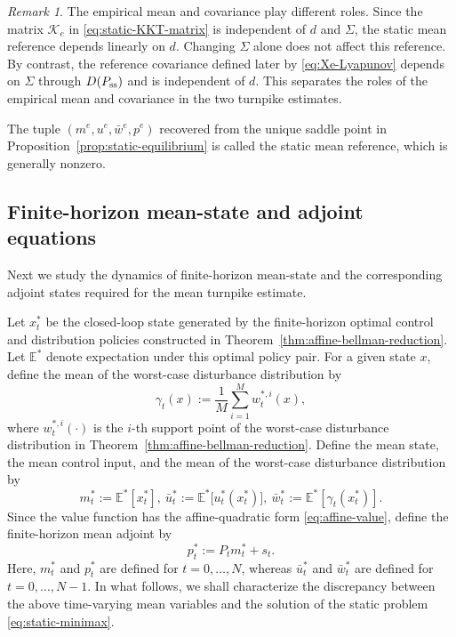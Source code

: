 \documentclass[10pt,journal,twoside]{IEEEtran}
\theoremstyle{definition}
\theoremstyle{remark}
\newtheorem{remark}{Remark}
\begin{document}
\begin{remark}
The empirical mean and covariance play different roles. Since the matrix
\(\mathcal K_e\) in \eqref{eq:static-KKT-matrix} is independent of \(d\) and
\(\Sigma\), the static mean reference depends linearly on \(d\). Changing
\(\Sigma\) alone does not affect this reference. By contrast, the reference
covariance defined later by \eqref{eq:Xe-Lyapunov} depends on \(\Sigma\) through
\(D(P_{\rm ss})\) and is independent of \(d\). This separates the roles of
the empirical mean and covariance in the two turnpike estimates.
\end{remark}




The tuple \((m^e,u^e,\bar w^e,p^e)\)  recovered from the
unique saddle point in Proposition~\ref{prop:static-equilibrium} is called the
static mean reference, which is generally nonzero.


\subsection{Finite-horizon mean-state and adjoint  equations}
\label{subsec:finite-horizon-mean-hamiltonian}

Next we study the dynamics of finite-horizon mean-state and the corresponding adjoint states required for the mean turnpike estimate.

Let \(x_t^*\) be the closed-loop state generated by the finite-horizon optimal control and distribution policies constructed in Theorem~\ref{thm:affine-bellman-reduction}. Let \(\mathbb E^*\) denote expectation under this optimal policy pair. For a given state \(x\), define the mean of the worst-case disturbance distribution by
\begingroup
\begin{equation}
	\gamma_t(x)
	:=
	\frac1M\sum_{i=1}^M w_t^{*,i}(x),
	\label{eq:avg-worst-case-support}
\end{equation}
\endgroup
{where \(w_t^{*,i}(\cdot)\) is the \(i\)-th support point of the worst-case disturbance distribution  in Theorem~\ref{thm:affine-bellman-reduction}.} Define the mean state, the mean control input, and the mean of the
worst-case disturbance distribution by
\begin{equation*}
		m_t^*:=\mathbb E^*[x_t^*],~
		\bar{u}_t^*:=
		\mathbb E^*\big[u_t^*(x_t^*)\big],
		~\bar{w}_t^*:=\mathbb E^*\left[\gamma_t(x_t^*)\right].
\end{equation*}
 Since the value function has the affine-quadratic form
\eqref{eq:affine-value}, define {the finite-horizon mean adjoint by}
\begin{equation}
	p_t^*:=P_tm_t^*+s_t .
	\label{eq:mean-p-affine}
\end{equation}
Here, \(m_t^*\) and \(p_t^*\) are defined for \(t=0,\ldots,N\), whereas \(\bar{u}_t^*\) and \(\bar{w}_t^*\) are defined for \(t=0,\ldots,N-1\). In what follows, we shall characterize the discrepancy between the above time-varying mean variables and the solution of the static problem \eqref{eq:static-minimax}.
\end{document}
